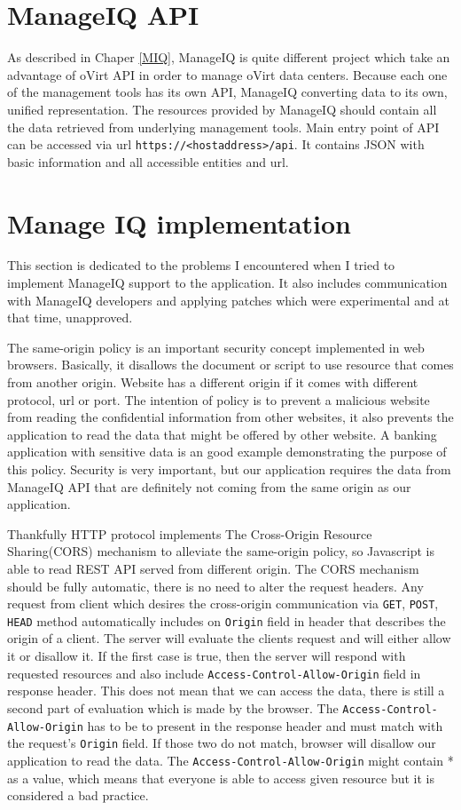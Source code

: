 \section{ManageIQ API}\label{miq}
As described in Chaper \ref{MIQ}, ManageIQ is quite different project which take an advantage of oVirt API in order to manage oVirt data centers. Because each one of the management tools has its own API, ManageIQ converting data to its own, unified representation. The resources provided by ManageIQ should contain all the data retrieved from underlying management tools.
Main entry point of API can be accessed via url \texttt{https://<hostaddress>/api}. It contains JSON with basic information and all accessible entities and url. 


\section{Manage IQ implementation}
This section is dedicated to the problems I encountered when I tried to implement ManageIQ support to the application. It also includes communication with ManageIQ developers and applying patches which were experimental and at that time, unapproved.

The same-origin policy\cite{policy} is an important security concept implemented in web browsers. Basically, it disallows the document or script to use resource that comes from another origin. Website has a different origin if it comes with different protocol, url or port. The intention of policy is to prevent a malicious website from reading the confidential information from other websites, it also prevents the application to read the data that might be offered by other website. A banking application with sensitive data is an good example demonstrating the purpose of this policy. Security is very important, but our application requires the data from ManageIQ API that are definitely not coming from the same origin as our application.

Thankfully HTTP protocol implements The Cross-Origin Resource Sharing(CORS)\cite{cors} mechanism to alleviate the same-origin policy, so Javascript is able to read REST API served from different origin. The CORS mechanism should be fully automatic, there is no need to alter the request headers. Any request from client which desires the cross-origin communication via \texttt{GET}, \texttt{POST}, \texttt{HEAD} method automatically includes on \texttt{Origin} field in header that describes the origin of a client. The server will evaluate the clients request and will either allow it or disallow it. If the first case is true, then the server will respond with requested resources and also include \texttt{Access-Control-Allow-Origin} field in response header. This does not mean that we can access the data, there is still a second part of evaluation which is made by the browser. The \texttt{Access-Control-Allow-Origin} has to be to present in the response header and must match with the request's \texttt{Origin} field. If those two do not match, browser will disallow our application to read the data. The \texttt{Access-Control-Allow-Origin} might contain * as a value, which means that everyone is able to access given resource but it is considered a bad practice.

